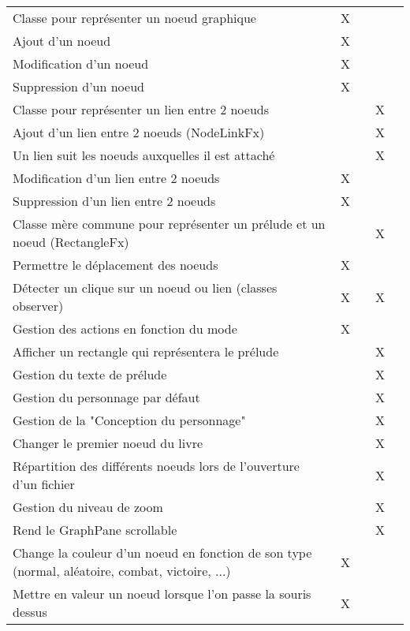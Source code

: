 \begin{centering}
\begin{longtable}{|p{8cm}|c|c|c|c|}
			\rowcolor{lightgray} \multicolumn{5}{|c|}{ \textbf{Zone d'édition}}\\
			\hline
			Classe pour représenter un noeud graphique & X & & & \\
			\hline
			Ajout d'un noeud & X & & & \\
			\hline
			Modification d'un noeud & X & & & \\
			\hline
			Suppression d'un noeud & X & & & \\
			\hline
			Classe pour représenter un lien entre 2 noeuds & & & X & \\
			\hline
			Ajout d'un lien entre 2 noeuds (NodeLinkFx) & & & X & \\
			\hline
			Un lien suit les noeuds auxquelles il est attaché& & & X & \\
			\hline
			Modification d'un lien entre 2 noeuds & X & & & \\
			\hline
			Suppression d'un lien entre 2 noeuds & X & & & \\
			\hline
			Classe mère commune pour représenter un prélude et un noeud (RectangleFx) & & & X & \\
			\hline
			Permettre le déplacement des noeuds & X & & & \\
			\hline
			Détecter un clique sur un noeud ou lien (classes observer) & X & & X & \\
			\hline
			Gestion des actions en fonction du mode & X & & & \\
			\hline
			Afficher un rectangle qui représentera le prélude & & & X & \\
			\hline
			Gestion du texte de prélude & & & X & \\
			\hline
			Gestion du personnage par défaut & & & X & \\
			\hline
			Gestion de la "Conception du personnage" & & & X & \\
			\hline
			Changer le premier noeud du livre & & & X & \\
			\hline
			Répartition des différents noeuds lors de l'ouverture d'un fichier& & & X & \\
			\hline
			Gestion du niveau de zoom& & & X & \\
			\hline
			Rend le GraphPane scrollable& & & X & \\
			\hline
			Change la couleur d'un noeud en fonction de son type (normal, aléatoire, combat, victoire, ...) & X & & & \\
			\hline
			Mettre en valeur un noeud lorsque l'on passe la souris dessus & X & & & \\
			\hline


\end{longtable}
\end{centering}
